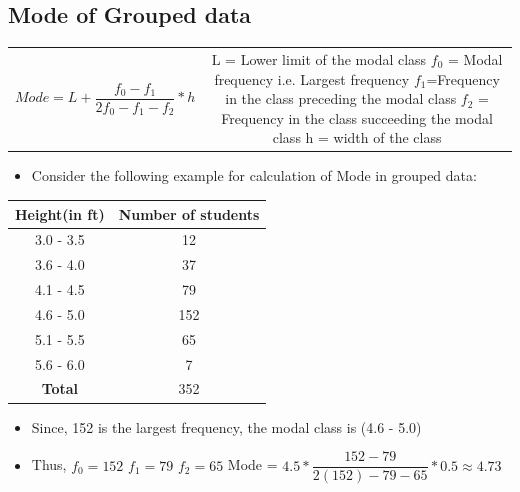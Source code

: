 \documentclass[8pt]{report}
\begin{document}
		\subsection{Mode of Grouped data}
			\begin{table}[H]
				\centering
				\def\arraystretch{1.5}
				\begin{tabular}{cc}
					\parbox{4cm}{$\boxed{Mode = L+\dfrac{f_0-f_1}{2f_0-f_1-f_2}*h}$} & \hspace{1cm}
					\parbox{10cm}{L = Lower limit of the modal class\\$f_0$ = Modal frequency i.e. Largest frequency\\$f_1$=Frequency in the class preceding the modal class\\$f_2$ = Frequency in the class succeeding the modal class\\h = width of the class}
				\end{tabular}
			\end{table}
			\begin{itemize}
				\item Consider the following example for calculation of Mode in grouped data:
			\end{itemize}
			\begin{table}[H]
				\centering
				\def\arraystretch{1.5}
				\begin{tabular}{|c|c|}
					\hline
					\textbf{Height(in ft)} & \textbf{Number of students}\\
					\hline
					3.0 - 3.5 & 12\\
					\hline
					3.6 - 4.0 & 37\\
					\hline
					4.1 - 4.5 & 79\\
					\hline
					4.6 - 5.0 & 152\\
					\hline
					5.1 - 5.5 & 65\\
					\hline
					5.6 - 6.0 & 7\\
					\hline
					\textbf{Total} & 352\\
					\hline
				\end{tabular}
			\end{table}
			\begin{itemize}
				\item Since, 152 is the largest frequency, the modal class is (4.6 - 5.0)
				\item Thus,  $\boxed{f_0 = 152}$ $\boxed{f_1 = 79}$ $\boxed{f_2 = 65}$ \hspace{1cm} Mode = $4.5 * \dfrac{152 - 79}{2(152) - 79 - 65}*0.5 \approx 4.73$
			\end{itemize}\hrulefill
\end{document}
